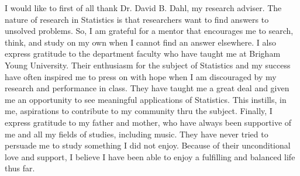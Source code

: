 I would like to first of all thank Dr. David B. Dahl, my research adviser. The nature of research in Statistics is that researchers want to find answers to unsolved problems. So, I am grateful for a mentor that encourages me to search, think, and study on my own when I cannot find an answer elsewhere.  I also express gratitude to the department faculty who have taught me at Brigham Young University. Their enthusiasm for the subject of Statistics and my success have often inspired me to press on with hope when I am discouraged by my research and performance in class. They have taught me a great deal and given me an opportunity to see meaningful applications of Statistics. This instills, in me, aspirations to contribute to my community thru the subject. Finally, I express gratitude to my father and mother, who have always been supportive of me and all my fields of studies, including music. They have never tried to persuade me to study something I did not enjoy. Because of their unconditional love and support, I believe I have been able to enjoy a fulfilling and balanced life thus far.
